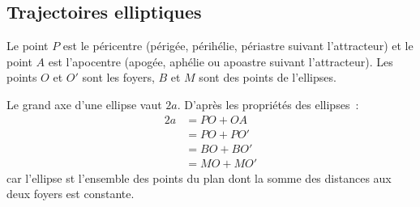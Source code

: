 \subsection{Trajectoires elliptiques}
Le point \(P\) est le péricentre (périgée, périhélie, périastre suivant 
l'attracteur) et le point \(A\) est l'apocentre (apogée, aphélie ou apoastre 
suivant l'attracteur). Les points \(O\) et \(O'\) sont les foyers, \(B\) et 
\(M\) sont des points de l'ellipses.

Le grand axe d'une ellipse vaut \(2a\). D'après les propriétés des ellipses~:
\begin{equation}\label{eq:trajell}
\begin{split}
  2a & = PO + OA \\
  & = PO + PO' \\
  & = BO + BO' \\
  & = MO + MO'
\end{split}
\end{equation}
car l'ellipse st l'ensemble des points du plan dont la somme des distances aux 
deux foyers est constante.

